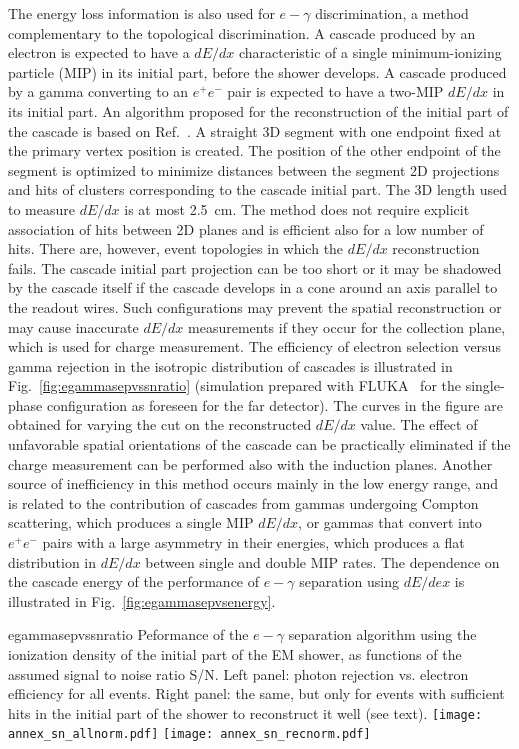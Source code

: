 The energy loss information is also used for $e-\gamma$
discrimination, a method complementary to the topological
discrimination.  A cascade produced by an electron is
expected to have a $dE/dx$ characteristic of a single minimum-ionizing particle (MIP)
in its initial part, before the shower develops. A cascade produced by a gamma
converting to an $e^+e^-$ pair is expected to have a two-MIP $dE/dx$ in its initial part. 
An algorithm proposed for the reconstruction of the initial part of the cascade is
based on Ref.~\cite{Antonello:2012hu}. A straight 3D segment with one
endpoint fixed at the primary vertex position is created.  The position
of the other endpoint of the segment is optimized to minimize distances
between the segment 2D projections and hits of clusters corresponding
to the cascade initial part. The 3D length used to measure $dE/dx$ is at
most 2.5~cm. The method does not require explicit association of hits
between 2D planes and is efficient also for a low number of
hits.  There are, however, event topologies in which the $dE/dx$
reconstruction fails. The cascade initial part projection can be too
short or it may be shadowed by the cascade itself if the cascade develops
in a cone around an axis parallel to the readout wires. Such configurations may
prevent the spatial reconstruction or may cause inaccurate $dE/dx$
measurements if they occur for the collection plane, which is used for charge
measurement. The efficiency of electron selection versus gamma
rejection in the isotropic distribution of cascades is illustrated in
Fig.~\ref{fig:egammasepvssnratio} (simulation prepared with FLUKA~\cite{FLUKA1,FLUKA2} for
the single-phase configuration as foreseen for the far detector). The curves in the
figure are obtained for varying the cut on the reconstructed $dE/dx$
value. The effect of unfavorable spatial orientations of the cascade can be
practically eliminated if the charge measurement can be performed also
with the induction planes. Another source of inefficiency in this method
occurs mainly in the low energy range, and is related to the
contribution of cascades from gammas undergoing Compton scattering, which 
produces a single MIP $dE/dx$, or gammas that convert into $e^+e^-$ pairs
with a large asymmetry in their energies, which produces a 
flat distribution in $dE/dx$ between single and double MIP rates. 
The dependence on the cascade energy of the performance of $e-\gamma$ separation using $dE/dex$
is illustrated in Fig.~\ref{fig:egammasepvsenergy}.

\begin{cdrfigure}{egammasepvssnratio}
{Peformance of the $e-\gamma$ separation algorithm using the ionization density of the
initial part of the EM shower, as functions of the assumed signal to noise ratio S/N.  Left
panel:  photon rejection vs. electron efficiency for all events.  Right panel:  the same,
but only for events with sufficient hits in the initial part of the shower to reconstruct
it well (see text).}
\texttt{[image: annex\_sn\_allnorm.pdf]}
\texttt{[image: annex\_sn\_recnorm.pdf]}
\end{cdrfigure}

